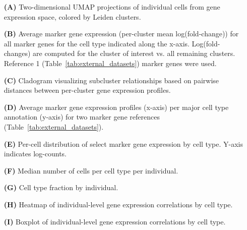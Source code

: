 \begin{itemize}
    \item[\textbf{(A)}] Two-dimensional UMAP projections of individual cells from gene expression space, colored by Leiden clusters. 
    \item[\textbf{(B)}] Average marker gene expression (per-cluster mean log(fold-change)) for all marker genes for the cell type indicated along the x-axis. Log(fold-changes) are computed for the cluster of interest vs. all remaining clusters. Reference 1 (Table~\ref{tab:external_datasets}) marker genes were used. 
    \item[\textbf{(C)}] Cladogram visualizing subcluster relationships based on pairwise distances between per-cluster gene expression profiles. 
    \item[\textbf{(D)}] Average marker gene expression profiles (x-axis) per major cell type annotation (y-axis) for two marker gene references (Table~\ref{tab:external_datasets}). 
    \item[\textbf{(E)}] Per-cell distribution of select marker gene expression by cell type. Y-axis indicates log-counts. 
    \item[\textbf{(F)}] Median number of cells per cell type per individual. 
    \item[\textbf{(G)}] Cell type fraction by individual. 
    \item[\textbf{(H)}] Heatmap of individual-level gene expression correlations by cell type. 
    \item[\textbf{(I)}] Boxplot of individual-level gene expression correlations by cell type. 
\end{itemize}